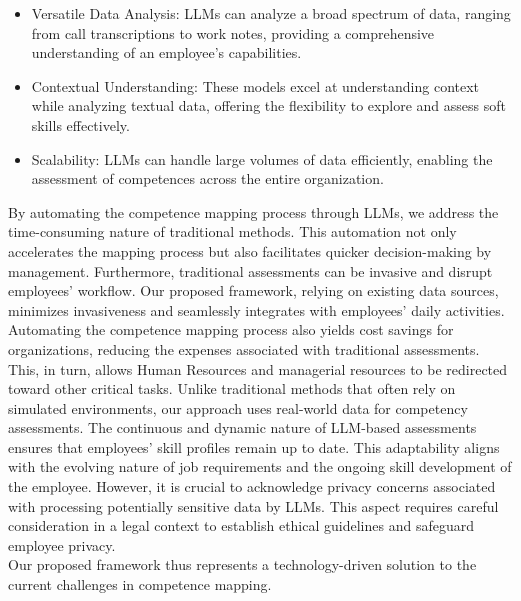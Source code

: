 \begin{itemize}
      \item Versatile Data Analysis: LLMs can analyze a broad spectrum of data, ranging from call transcriptions to work notes, providing a comprehensive understanding of an employee's capabilities.

      \item Contextual Understanding: These models excel at understanding context while analyzing textual data, offering the flexibility to explore and assess soft skills effectively.

      \item Scalability: LLMs can handle large volumes of data efficiently, enabling the assessment of competences across the entire organization.
\end{itemize}

By automating the competence mapping process through LLMs, we address the time-consuming nature of traditional methods. This automation not only accelerates the mapping process but also facilitates quicker decision-making by management. Furthermore, traditional assessments can be invasive and disrupt employees' workflow. Our proposed framework, relying on existing data sources, minimizes invasiveness and seamlessly integrates with employees' daily activities. Automating the competence mapping process also yields cost savings for organizations, reducing the expenses associated with traditional assessments. This, in turn, allows Human Resources and managerial resources to be redirected toward other critical tasks. Unlike traditional methods that often rely on simulated environments, our approach uses real-world data for competency assessments. The continuous and dynamic nature of LLM-based assessments ensures that employees' skill profiles remain up to date. This adaptability aligns with the evolving nature of job requirements and the ongoing skill development of the employee. However, it is crucial to acknowledge privacy concerns associated with processing potentially sensitive data by LLMs. This aspect requires careful consideration in a legal context to establish ethical guidelines and safeguard employee privacy.\\

Our proposed framework thus represents a technology-driven solution to the current challenges in competence mapping.